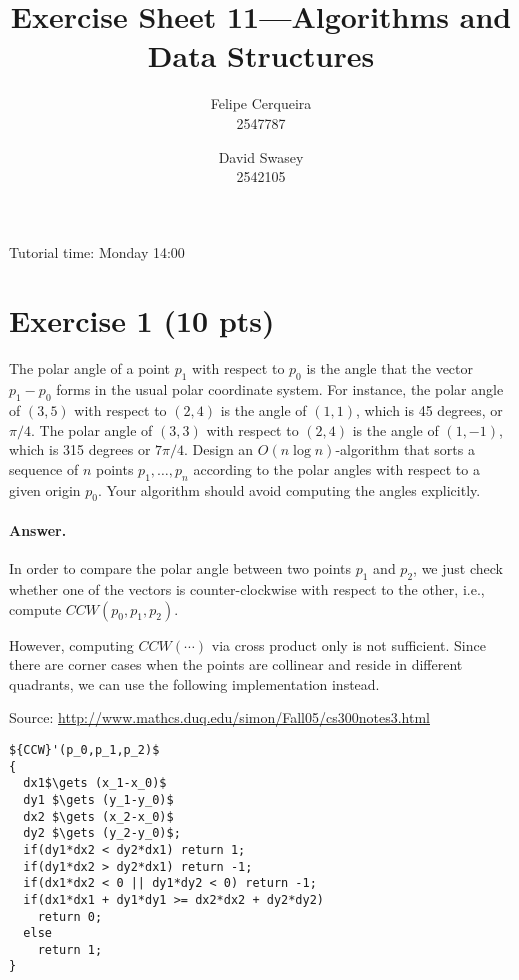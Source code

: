 \documentclass[a4paper]{article}
\title{Exercise Sheet 11---Algorithms and Data Structures}
\author{Felipe Cerqueira \\ 2547787 \and David Swasey \\ 2542105}
\begin{document}
\maketitle

Tutorial time: Monday 14:00


\section*{Exercise 1 (10 pts)}

The polar angle of a point $p_1$ with respect to $p_0$ is the angle that the vector $p_1 - p_0$ forms in the usual polar coordinate system. For instance, the polar angle of $(3, 5)$ with respect to $(2, 4)$ is the angle of $(1, 1)$, which is 45 degrees, or $\pi/4$. The polar angle of $(3, 3
)$ with respect to $(2, 4)$ is the angle of $(1, -1)$, which is 315 degrees or $7\pi/4$. Design an $O(n \log n)$-algorithm that sorts a sequence of $n$ points $p_1, \ldots, p_n$ according to the polar angles with respect to a given origin $p_0$. Your algorithm should avoid computing the angles explicitly.

\paragraph{Answer.}

In order to compare the polar angle between two points $p_1$ and $p_2$, we just check whether one of the vectors is counter-clockwise with respect to the other, i.e., compute $CCW(p_0, p_1, p_2)$.

However, computing ${CCW}(\cdots)$ via cross product only is not sufficient. Since there are corner cases when the points are collinear and reside in different quadrants, we can use the following implementation instead.

Source: \url{http://www.mathcs.duq.edu/simon/Fall05/cs300notes3.html}

\begin{lstlisting}[mathescape]
${CCW}'(p_0,p_1,p_2)$
{
  dx1$\gets (x_1-x_0)$
  dy1 $\gets (y_1-y_0)$
  dx2 $\gets (x_2-x_0)$
  dy2 $\gets (y_2-y_0)$;
  if(dy1*dx2 < dy2*dx1) return 1;
  if(dy1*dx2 > dy2*dx1) return -1;
  if(dx1*dx2 < 0 || dy1*dy2 < 0) return -1;
  if(dx1*dx1 + dy1*dy1 >= dx2*dx2 + dy2*dy2)
    return 0;
  else
    return 1;
}
\end{lstlisting}




\end{document}
